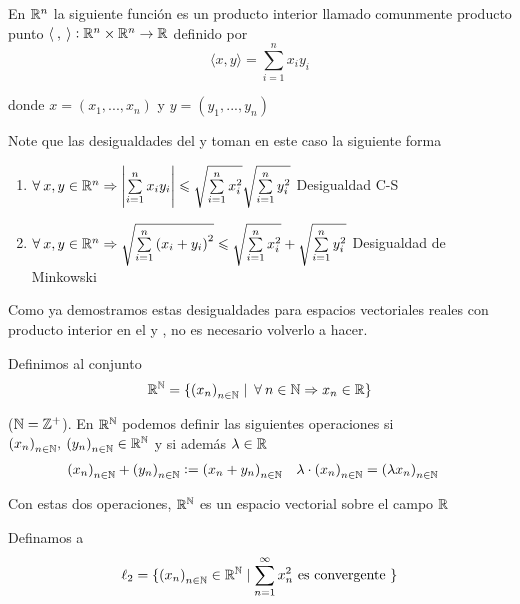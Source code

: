 \begin{eg}
    En $\mathbb{R}^n$ la siguiente función es un producto interior llamado comunmente producto punto $\langle \: , \: \rangle  : \mathbb{R}^n \times \mathbb{R}^n \to \mathbb{R}$ definido por 
    \begin{equation*}
        \langle x , y \rangle = \sum\limits_{i=1}^{n} {x}_{i} {y}_{i}
    \end{equation*}

    donde $x=({x}_{1},...,{x}_{n})$ y  $y=({y}_{1},...,{y}_{n})$

    \smallskip
    
    Note que las desigualdades del  y  toman en este caso la siguiente forma

    \begin{enumerate}
        \item $\forall \: x , y \in \mathbb{R}^n \Rightarrow \abs{\sum\limits_{i=1}^{n} {x}_{i} {y}_{i}} \leqslant \sqrt{\sum\limits_{i=1}^{n} {x}_{i}^{2}} \sqrt{\sum\limits_{i=1}^{n} {y}_{i}^{2}}$ \hfill \textcolor{ForestGreen!70!black}{Desigualdad C-S}
        \item $\forall \: x , y \in \mathbb{R}^n \Rightarrow \sqrt{\sum\limits_{i=1}^{n} {({x}_{i}+{y}_{i})}^{2}} \leqslant \sqrt{\sum\limits_{i=1}^{n} {x}_{i}^{2}} + \sqrt{\sum\limits_{i=1}^{n} {y}_{i}^{2}}$ \hfill \textcolor{ForestGreen!70!black}{Desigualdad de Minkowski}
    \end{enumerate}
\end{eg}

\begin{remark}
    Como ya demostramos estas desigualdades para espacios vectoriales reales con producto interior en el  y , no es necesario volverlo a hacer.
\end{remark}

\begin{eg}
    Definimos al conjunto
    \begin{equation*}
        {\ensuremath{\mathbb{R}}}^{\mathbb{N}} = \{ {({x}_{n})}_{n \in \mathbb{N}} \mid \: \forall \: n \in \mathbb{N} \Rightarrow x_n \in \mathbb{R}\}        
    \end{equation*}

    ($\mathbb{N} = {\mathbb{Z}}^{+}$). En ${\mathbb{R}}^{\mathbb{N}}$ podemos definir las siguientes operaciones si ${({x}_{n})}_{n \in \mathbb{N}}, \: {({y}_{n})}_{n \in \mathbb{N}} \in \mathbb{R}^{\mathbb{N}}$ y si además $\lambda \in \mathbb{R}$
    \begin{align*}
         {({x}_{n})}_{n \in \mathbb{N}} +  {({y}_{n})}_{n \in \mathbb{N}} := {({x}_{n}+{y}_{n})}_{n \in \mathbb{N}} &&& \lambda \cdot {({x}_{n})}_{n \in \mathbb{N}} = {(\lambda {x}_{n})}_{n \in \mathbb{N}}
    \end{align*}

    Con estas dos operaciones, $\mathbb{R}^{\mathbb{N}}$ es un espacio vectorial sobre el campo $\mathbb{R}$

    Definamos a 
    \begin{equation*}
        {\ell}_{2} = \{  {({x}_{n})}_{n \in \mathbb{N}} \in \mathbb{R}^{\mathbb{N}} \mid  \sum_{n=1}^{\infty} {x}_{n}^{2} \text{ es convergente } \}
    \end{equation*}
\end{eg}

